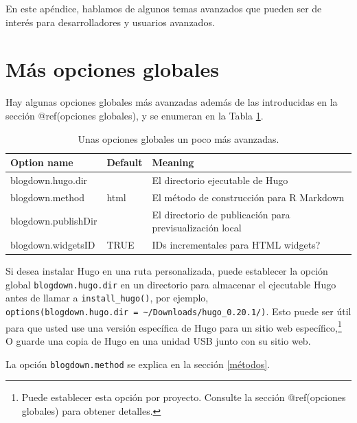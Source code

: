 \documentclass[12pt,]{krantz}
\theoremstyle{definition}
\theoremstyle{definition}
\theoremstyle{definition}
\theoremstyle{remark}
\begin{document}
En este apéndice, hablamos de algunos temas avanzados que pueden ser de
interés para desarrolladores y usuarios avanzados.

\hypertarget{mas-opciones-globales}{%
\section{Más opciones globales}\label{mas-opciones-globales}}

Hay algunas opciones globales más avanzadas 
además de las introducidas en la sección @ref(opciones globales), y se
enumeran en la Tabla \ref{tab:global-options2}.

\begin{table}

\caption{\label{tab:global-options2}Unas opciones globales un poco más avanzadas.}
\centering
\begin{tabular}[t]{lll}
\toprule
Option name & Default & Meaning\\
\midrule
blogdown.hugo.dir &  & El directorio ejecutable de Hugo\\
blogdown.method & html & El método de construcción para R Markdown\\
blogdown.publishDir &  & El directorio de publicación para previsualización local\\
blogdown.widgetsID & TRUE & IDs incrementales para HTML widgets?\\
\bottomrule
\end{tabular}
\end{table}

Si desea instalar Hugo en una ruta personalizada, puede establecer la
opción global \texttt{blogdown.hugo.dir} en un directorio para almacenar
el ejecutable Hugo antes de llamar a \texttt{install\_hugo()}, por
ejemplo,
\texttt{options(blogdown.hugo.dir\ =\ \textquotesingle{}\textasciitilde{}/Downloads/hugo\_0.20.1/\textquotesingle{})}.
Esto puede ser útil para que usted use una versión específica de Hugo
para un sitio web específico,\footnote{Puede establecer esta opción por
  proyecto. Consulte la sección @ref(opciones globales) para obtener
  detalles.} O guarde una copia de Hugo en una unidad USB junto con su
sitio web.

La opción \texttt{blogdown.method} se explica en la sección
\ref{métodos}.
\end{document}
